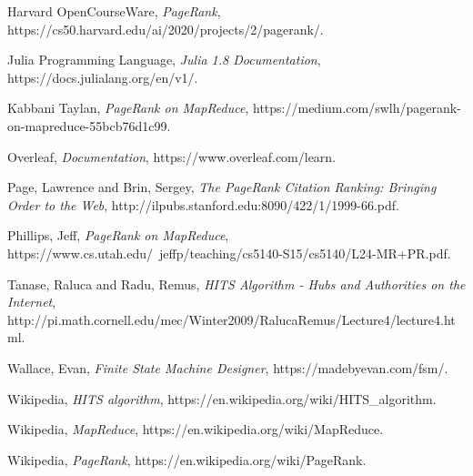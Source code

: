 \documentclass{article}
\begin{document}
\begin{thebibliography}{9}
Harvard OpenCourseWare, \emph{PageRank}, https://cs50.harvard.edu/ai/2020/projects/2/pagerank/.

Julia Programming Language, \emph{Julia 1.8 Documentation}, https://docs.julialang.org/en/v1/.

Kabbani Taylan, \emph{PageRank on MapReduce}, https://medium.com/swlh/pagerank-on-mapreduce-55bcb76d1c99.

Overleaf, \emph{Documentation}, https://www.overleaf.com/learn.

Page, Lawrence and Brin, Sergey, \emph{The PageRank Citation Ranking:
Bringing Order to the Web}, http://ilpubs.stanford.edu:8090/422/1/1999-66.pdf.

Phillips, Jeff, \emph{PageRank on MapReduce}, 
https://www.cs.utah.edu/~jeffp/teaching/cs5140-S15/cs5140/L24-MR+PR.pdf.

Tanase, Raluca and Radu, Remus, \emph{HITS Algorithm - Hubs and Authorities on the Internet}, http://pi.math.cornell.edu/mec/Winter2009/RalucaRemus/Lecture4/lecture4.html.

Wallace, Evan, \emph{Finite State Machine Designer}, https://madebyevan.com/fsm/.

Wikipedia, \emph{HITS algorithm}, https://en.wikipedia.org/wiki/HITS\_algorithm.

Wikipedia, \emph{MapReduce}, https://en.wikipedia.org/wiki/MapReduce.

Wikipedia, \emph{PageRank}, https://en.wikipedia.org/wiki/PageRank.

\end{thebibliography}
\end{document}
